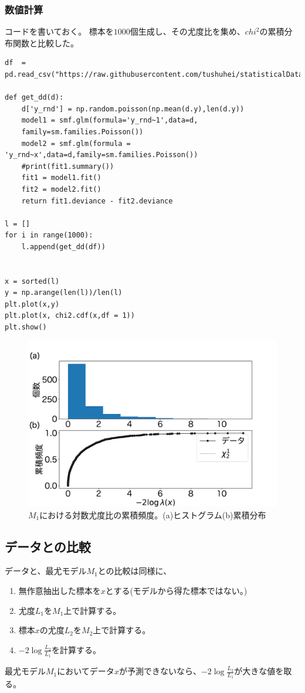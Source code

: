 \subsubsection{数値計算}
コードを書いておく。
標本を$1000$個生成し、その尤度比を集め、$chi^2$の累積分布関数と比較した。
\begin{lstlisting}
df  = pd.read_csv("https://raw.githubusercontent.com/tushuhei/statisticalDataModeling/master/data3a.csv")

def get_dd(d):
    d['y_rnd'] = np.random.poisson(np.mean(d.y),len(d.y))
    model1 = smf.glm(formula='y_rnd~1',data=d,
    family=sm.families.Poisson())
    model2 = smf.glm(formula = 'y_rnd~x',data=d,family=sm.families.Poisson())
    #print(fit1.summary())
    fit1 = model1.fit()
    fit2 = model2.fit()
    return fit1.deviance - fit2.deviance

l = []
for i in range(1000):
    l.append(get_dd(df))


x = sorted(l)
y = np.arange(len(l))/len(l)
plt.plot(x,y)
plt.plot(x, chi2.cdf(x,df = 1))
plt.show()
\end{lstlisting}


\begin{figure}
    \begin{center}
        \includegraphics[width=15cm]{./image/04_/loglikeli_poisson_model_test.pdf}
        \caption{$M_1$における対数尤度比の累積頻度。(a)ヒストグラム(b)累積分布}
        \label{fig:loglikelihood_test_simulation_poisson}
    \end{center}
\end{figure}

\subsection{データとの比較}
データと、最尤モデル$M_1$との比較は同様に、
\begin{enumerate}
 \item 無作意抽出した標本を$x$とする(モデルから得た標本ではない。)
 \item 尤度$L_1$を$M_1$上で計算する。
 \item 標本$x$の尤度$L_2$を$M_2$上で計算する。
 \item $-2\log\frac{L_2}{L_1}$を計算する。
\end{enumerate}
最尤モデル$M_1$においてデータ$x$が予測できないなら、$-2\log\frac{L_2}{L_1}$が大きな値を取る。



